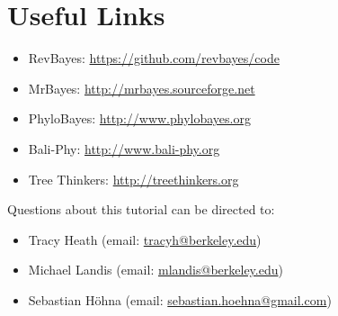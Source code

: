 \documentclass[11pt]{article}
\begin{document}
\bigskip
\section*{Useful Links}

\begin{itemize}
\item RevBayes: \href{https://github.com/revbayes/code}{https://github.com/revbayes/code} \\ \vspace{-7mm}
\item MrBayes: \href{http://mrbayes.sourceforge.net/}{http://mrbayes.sourceforge.net} \\ \vspace{-7mm}
\item PhyloBayes: \href{http://megasun.bch.umontreal.ca/People/lartillot/www/index.htm}{http://www.phylobayes.org} \\ \vspace{-7mm}
\item Bali-Phy: \href{http://www.bali-phy.org/}{http://www.bali-phy.org} \\ \vspace{-7mm}
\item Tree Thinkers: \href{http://treethinkers.org/}{http://treethinkers.org} \\ \vspace{-7mm}
\end{itemize}

Questions about this tutorial can be directed to: \\\vspace{-10mm}
\begin{itemize}
\item Tracy Heath (email: \href{mailto:tracyh@berkeley.edu}{tracyh@berkeley.edu}) \\\vspace{-8mm}
\item Michael Landis (email: \href{mailto:mlandis@berkeley.edu}{mlandis@berkeley.edu}) \\\vspace{-8mm} 
\item Sebastian H\"{o}hna (email: \href{mailto:sebastian.hoehna@gmail.com}{sebastian.hoehna@gmail.com})
\end{itemize}
\end{document}
